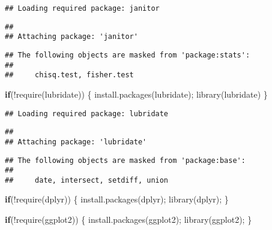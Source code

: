 \documentclass[
]{article}
\newenvironment{Shaded}{\begin{snugshade}}{\end{snugshade}}
\newcommand{\ControlFlowTok}[1]{\textcolor[rgb]{0.13,0.29,0.53}{\textbf{#1}}}
\newcommand{\FunctionTok}[1]{\textcolor[rgb]{0.00,0.00,0.00}{#1}}
\newcommand{\NormalTok}[1]{#1}
\newcommand{\SpecialCharTok}[1]{\textcolor[rgb]{0.00,0.00,0.00}{#1}}
\newcommand{\StringTok}[1]{\textcolor[rgb]{0.31,0.60,0.02}{#1}}
\begin{document}
\begin{verbatim}
## Loading required package: janitor
\end{verbatim}

\begin{verbatim}
## 
## Attaching package: 'janitor'
\end{verbatim}

\begin{verbatim}
## The following objects are masked from 'package:stats':
## 
##     chisq.test, fisher.test
\end{verbatim}

\begin{Shaded}
\begin{Highlighting}[]
\ControlFlowTok{if}\NormalTok{(}\SpecialCharTok{!}\FunctionTok{require}\NormalTok{(}\StringTok{\textquotesingle{}lubridate\textquotesingle{}}\NormalTok{))}
\NormalTok{\{}
\FunctionTok{install.packages}\NormalTok{(}\StringTok{\textquotesingle{}lubridate\textquotesingle{}}\NormalTok{);}
  \FunctionTok{library}\NormalTok{(lubridate)}
\NormalTok{\}  }
\end{Highlighting}
\end{Shaded}

\begin{verbatim}
## Loading required package: lubridate
\end{verbatim}

\begin{verbatim}
## 
## Attaching package: 'lubridate'
\end{verbatim}

\begin{verbatim}
## The following objects are masked from 'package:base':
## 
##     date, intersect, setdiff, union
\end{verbatim}

\begin{Shaded}
\begin{Highlighting}[]
\ControlFlowTok{if}\NormalTok{(}\SpecialCharTok{!}\FunctionTok{require}\NormalTok{(}\StringTok{\textquotesingle{}dplyr\textquotesingle{}}\NormalTok{))}
\NormalTok{\{}
\FunctionTok{install.packages}\NormalTok{(}\StringTok{\textquotesingle{}dplyr\textquotesingle{}}\NormalTok{);}
  \FunctionTok{library}\NormalTok{(dplyr);}
\NormalTok{\}}
\end{Highlighting}
\end{Shaded}

\begin{Shaded}
\begin{Highlighting}[]
\ControlFlowTok{if}\NormalTok{(}\SpecialCharTok{!}\FunctionTok{require}\NormalTok{(}\StringTok{\textquotesingle{}ggplot2\textquotesingle{}}\NormalTok{))}
\NormalTok{\{}
\FunctionTok{install.packages}\NormalTok{(}\StringTok{\textquotesingle{}ggplot2\textquotesingle{}}\NormalTok{);}
  \FunctionTok{library}\NormalTok{(ggplot2);}
\NormalTok{\}}
\end{Highlighting}
\end{Shaded}
\end{document}

